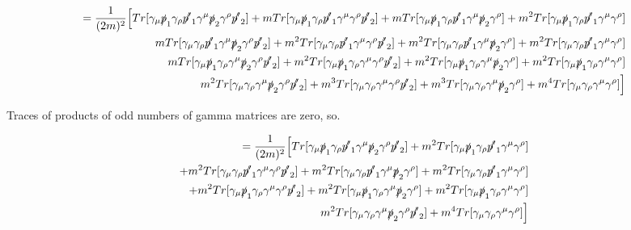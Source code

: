 \documentclass[a4]{article}
\begin{document}
    \begin{eqnarray}
        = \frac{1}{(2 m)^2} \Big[ Tr[ \gamma_\mu \slashed{p}_1 \gamma_\rho \slashed{p'}_1 \gamma^\mu \slashed{p}_2 \gamma^\rho \slashed{p'}_2] + m Tr[\gamma_\mu \slashed{p}_1 \gamma_\rho \slashed{p'}_1 \gamma^\mu \gamma^\rho \slashed{p'}_2] + m Tr[\gamma_\mu \slashed{p}_1 \gamma_\rho \slashed{p'}_1 \gamma^\mu \slashed{p}_2 \gamma^\rho] + m^2 Tr[\gamma_\mu \slashed{p}_1 \gamma_\rho \slashed{p'}_1 \gamma^\mu \gamma^\rho] \\
        m Tr[\gamma_\mu \gamma_\rho \slashed{p'}_1 \gamma^\mu \slashed{p}_2 \gamma^\rho \slashed{p'}_2] + m^2 Tr[\gamma_\mu \gamma_\rho \slashed{p'}_1 \gamma^\mu \gamma^\rho \slashed{p'}_2] + m^2 Tr[\gamma_\mu \gamma_\rho \slashed{p'}_1 \gamma^\mu \slashed{p}_2 \gamma^\rho] + m^2 Tr[\gamma_\mu \gamma_\rho \slashed{p'}_1 \gamma^\mu \gamma^\rho] \\
        m Tr[\gamma_\mu \slashed{p}_1 \gamma_\rho \gamma^\mu \slashed{p}_2 \gamma^\rho \slashed{p'}_2] + m^2 Tr[\gamma_\mu \slashed{p}_1 \gamma_\rho \gamma^\mu \gamma^\rho \slashed{p'}_2] + m^2 Tr[\gamma_\mu \slashed{p}_1 \gamma_\rho \gamma^\mu \slashed{p}_2 \gamma^\rho] + m^2 Tr[\gamma_\mu \slashed{p}_1 \gamma_\rho \gamma^\mu \gamma^\rho] \\
        m^2 Tr[\gamma_\mu \gamma_\rho \gamma^\mu \slashed{p}_2 \gamma^\rho \slashed{p'}_2] + m^3 Tr[\gamma_\mu \gamma_\rho \gamma^\mu \gamma^\rho \slashed{p'}_2] + m^3 Tr[\gamma_\mu \gamma_\rho \gamma^\mu \slashed{p}_2 \gamma^\rho] + m^4 Tr[\gamma_\mu \gamma_\rho \gamma^\mu \gamma^\rho] \Big]
    \end{eqnarray}

    Traces of products of odd numbers of gamma matrices are zero, so.

    \begin{eqnarray}
        = \frac{1}{(2 m)^2} \Big[ Tr[ \gamma_\mu \slashed{p}_1 \gamma_\rho \slashed{p'}_1 \gamma^\mu \slashed{p}_2 \gamma^\rho \slashed{p'}_2] + m^2 Tr[\gamma_\mu \slashed{p}_1 \gamma_\rho \slashed{p'}_1 \gamma^\mu \gamma^\rho] \\
        + m^2 Tr[\gamma_\mu \gamma_\rho \slashed{p'}_1 \gamma^\mu \gamma^\rho \slashed{p'}_2] + m^2 Tr[\gamma_\mu \gamma_\rho \slashed{p'}_1 \gamma^\mu \slashed{p}_2 \gamma^\rho] + m^2 Tr[\gamma_\mu \gamma_\rho \slashed{p'}_1 \gamma^\mu \gamma^\rho] \\
        + m^2 Tr[\gamma_\mu \slashed{p}_1 \gamma_\rho \gamma^\mu \gamma^\rho \slashed{p'}_2] + m^2 Tr[\gamma_\mu \slashed{p}_1 \gamma_\rho \gamma^\mu \slashed{p}_2 \gamma^\rho] + m^2 Tr[\gamma_\mu \slashed{p}_1 \gamma_\rho \gamma^\mu \gamma^\rho] \\
        m^2 Tr[\gamma_\mu \gamma_\rho \gamma^\mu \slashed{p}_2 \gamma^\rho \slashed{p'}_2] + m^4 Tr[\gamma_\mu \gamma_\rho \gamma^\mu \gamma^\rho] \Big]
    \end{eqnarray}
\end{document}
